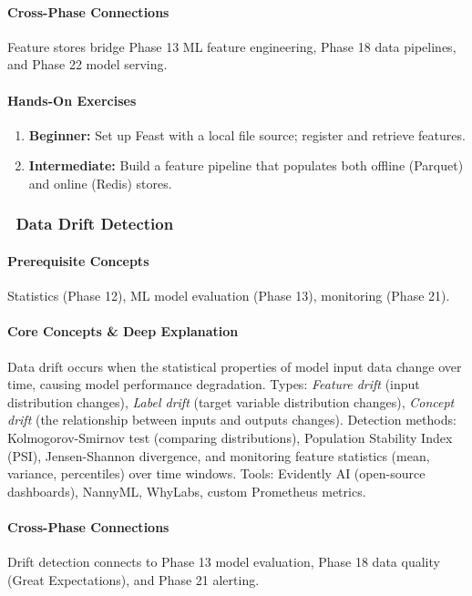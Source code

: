 \documentclass[11pt, a4paper, oneside]{report}
\newcommand{\awareness}[1]{\subsubsection{\texorpdfstring{\fcolorbox{gray!50}{gray!10}{\footnotesize\bfseries\color{gray!50!black} AWARENESS}~#1}{#1}}}
\begin{document}
\paragraph{Cross-Phase Connections} Feature stores bridge Phase 13 ML feature engineering, Phase 18 data pipelines, and Phase 22 model serving.

\paragraph{Hands-On Exercises}
\begin{enumerate}[leftmargin=*]
\item \textbf{Beginner:} Set up Feast with a local file source; register and retrieve features.
\item \textbf{Intermediate:} Build a feature pipeline that populates both offline (Parquet) and online (Redis) stores.
\end{enumerate}


\awareness{Data Drift Detection}

\paragraph{Prerequisite Concepts} Statistics (Phase 12), ML model evaluation (Phase 13), monitoring (Phase 21).

\paragraph{Core Concepts \& Deep Explanation} Data drift occurs when the statistical properties of model input data change over time, causing model performance degradation. Types: \emph{Feature drift} (input distribution changes), \emph{Label drift} (target variable distribution changes), \emph{Concept drift} (the relationship between inputs and outputs changes). Detection methods: Kolmogorov-Smirnov test (comparing distributions), Population Stability Index (PSI), Jensen-Shannon divergence, and monitoring feature statistics (mean, variance, percentiles) over time windows. Tools: Evidently AI (open-source dashboards), NannyML, WhyLabs, custom Prometheus metrics.

\paragraph{Cross-Phase Connections} Drift detection connects to Phase 13 model evaluation, Phase 18 data quality (Great Expectations), and Phase 21 alerting.
\end{document}
